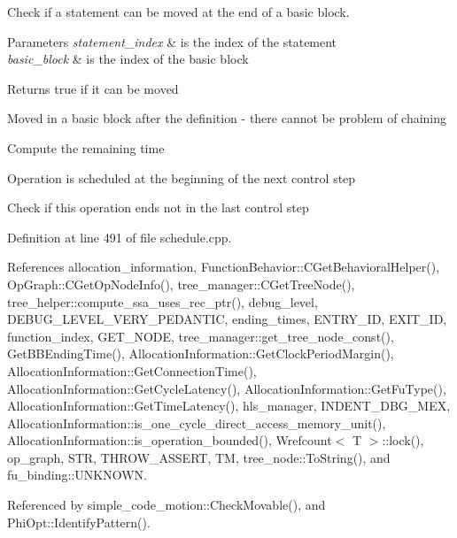 Check if a statement can be moved at the end of a basic block. 


\begin{DoxyParams}{Parameters}
{\em statement\+\_\+index} & is the index of the statement \\
\hline
{\em basic\+\_\+block} & is the index of the basic block \\
\hline
\end{DoxyParams}
\begin{DoxyReturn}{Returns}
true if it can be moved 
\end{DoxyReturn}
Moved in a basic block after the definition -\/ there cannot be problem of chaining

Compute the remaining time

Operation is scheduled at the beginning of the next control step

Check if this operation ends not in the last control step 

Definition at line 491 of file schedule.\+cpp.



References allocation\+\_\+information, Function\+Behavior\+::\+C\+Get\+Behavioral\+Helper(), Op\+Graph\+::\+C\+Get\+Op\+Node\+Info(), tree\+\_\+manager\+::\+C\+Get\+Tree\+Node(), tree\+\_\+helper\+::compute\+\_\+ssa\+\_\+uses\+\_\+rec\+\_\+ptr(), debug\+\_\+level, D\+E\+B\+U\+G\+\_\+\+L\+E\+V\+E\+L\+\_\+\+V\+E\+R\+Y\+\_\+\+P\+E\+D\+A\+N\+T\+IC, ending\+\_\+times, E\+N\+T\+R\+Y\+\_\+\+ID, E\+X\+I\+T\+\_\+\+ID, function\+\_\+index, G\+E\+T\+\_\+\+N\+O\+DE, tree\+\_\+manager\+::get\+\_\+tree\+\_\+node\+\_\+const(), Get\+B\+B\+Ending\+Time(), Allocation\+Information\+::\+Get\+Clock\+Period\+Margin(), Allocation\+Information\+::\+Get\+Connection\+Time(), Allocation\+Information\+::\+Get\+Cycle\+Latency(), Allocation\+Information\+::\+Get\+Fu\+Type(), Allocation\+Information\+::\+Get\+Time\+Latency(), hls\+\_\+manager, I\+N\+D\+E\+N\+T\+\_\+\+D\+B\+G\+\_\+\+M\+EX, Allocation\+Information\+::is\+\_\+one\+\_\+cycle\+\_\+direct\+\_\+access\+\_\+memory\+\_\+unit(), Allocation\+Information\+::is\+\_\+operation\+\_\+bounded(), Wrefcount$<$ T $>$\+::lock(), op\+\_\+graph, S\+TR, T\+H\+R\+O\+W\+\_\+\+A\+S\+S\+E\+RT, TM, tree\+\_\+node\+::\+To\+String(), and fu\+\_\+binding\+::\+U\+N\+K\+N\+O\+WN.



Referenced by simple\+\_\+code\+\_\+motion\+::\+Check\+Movable(), and Phi\+Opt\+::\+Identify\+Pattern().

